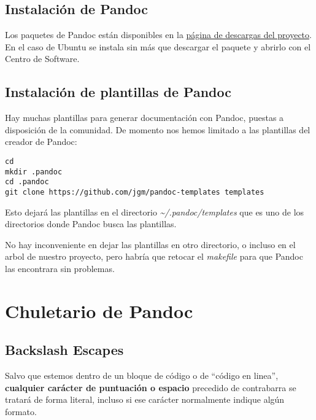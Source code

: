 \documentclass[
  12pt,
  spanish,
]{article}
\begin{document}
\hypertarget{instalaciuxf3n-de-pandoc}{%
\subsection{Instalación de Pandoc}\label{instalaciuxf3n-de-pandoc}}

Los paquetes de Pandoc están disponibles en la
\href{http://pandoc.org/installing.html}{página de descargas del
proyecto}. En el caso de Ubuntu se instala sin más que descargar el
paquete y abrirlo con el Centro de Software.

\hypertarget{instalaciuxf3n-de-plantillas-de-pandoc}{%
\subsection{Instalación de plantillas de
Pandoc}\label{instalaciuxf3n-de-plantillas-de-pandoc}}

Hay muchas plantillas para generar documentación con Pandoc, puestas a
disposición de la comunidad. De momento nos hemos limitado a las
plantillas del creador de Pandoc:

\begin{verbatim}
cd 
mkdir .pandoc
cd .pandoc
git clone https://github.com/jgm/pandoc-templates templates
\end{verbatim}

Esto dejará las plantillas en el directorio
\emph{\textasciitilde/.pandoc/templates} que es uno de los directorios
donde Pandoc busca las plantillas.

No hay inconveniente en dejar las plantillas en otro directorio, o
incluso en el arbol de nuestro proyecto, pero habría que retocar el
\emph{makefile} para que Pandoc las encontrara sin problemas.

\hypertarget{chuletario-de-pandoc}{%
\section{Chuletario de Pandoc}\label{chuletario-de-pandoc}}

\hypertarget{backslash-escapes}{%
\subsection{Backslash Escapes}\label{backslash-escapes}}

Salvo que estemos dentro de un bloque de código o de ``código en
linea'', \textbf{cualquier carácter de puntuación o espacio} precedido
de contrabarra se tratará de forma literal, incluso si ese carácter
normalmente indique algún formato.
\end{document}
